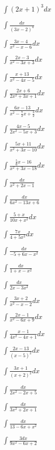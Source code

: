 \begin{multicols}{2}
$\displaystyle \int (2x+1)^3dx$

$\displaystyle \int \frac{dx}{(3x-2)^4}$

$\displaystyle \int \frac{3x-4}{x^2-x-6}dx$

$\displaystyle \int \frac{2x-3}{x^2-3x+3}dx$

$\displaystyle \int \frac{x+13}{x^2-4x-5}dx$

$\displaystyle \int \frac{2x+6}{2x^2+3x+1}dx$

$\displaystyle \int \frac{6x-13}{x^2-\frac{7}{2}x+\frac{3}{2}}dx$

$\displaystyle \int \frac{4x-5}{2x^2-5x+3}dx$

$\displaystyle \int \frac{5x+11}{x^2+3x-10}dx$

$\displaystyle \int \frac{\frac{5}{6}x-16}{x^2+3x-18}dx$

$\displaystyle \int \frac{dx}{x^2+2x-1}$

$\displaystyle \int \frac{dx}{6x^2-13x+6}$

$\displaystyle \int \frac{5+x}{10x+x^2}dx$

$\displaystyle \int \frac{7x}{4+5x^2}dx$

$\displaystyle \int \frac{dx}{-5+6x-x^2}$

$\displaystyle \int \frac{dx}{1+x-x^2}$

$\displaystyle \int \frac{dx}{2x-3x^2}$

$\displaystyle \int \frac{3x+2}{x^2-x-2}dx$

$\displaystyle \int \frac{2x-1}{x^2-6x+9}dx$

$\displaystyle \int \frac{x-1}{4x^2-4x+1}dx$

$\displaystyle \int \frac{2x-13}{(x-5)^2}dx$

$\displaystyle \int \frac{3x+1}{(x+2)^2}dx$

$\displaystyle \int \frac{dx}{2x^2-2x+5}$

$\displaystyle \int \frac{dx}{3x^2+2x+1}$

$\displaystyle \int \frac{dx}{13-6x+x^2}$

$\displaystyle \int \frac{3dx}{9x^2-6x+2}$


\end{multicols}
